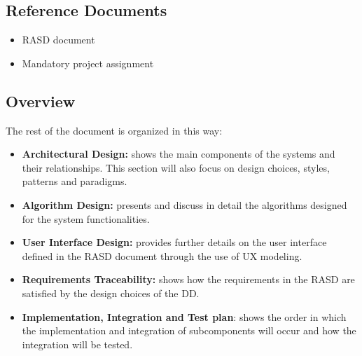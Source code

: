 \subsection{Reference Documents}
\begin{itemize}
	\item RASD document
	\item Mandatory project assignment
\end{itemize}

\subsection{Overview}
The rest of the document is organized in this way:
\begin{itemize}

	\item \textbf{Architectural Design:} shows the main components of the systems and their relationships. This section will also focus on design choices, styles, patterns and paradigms. 
	\item \textbf{Algorithm Design:} presents and discuss in detail the algorithms designed for the system functionalities.
	\item \textbf{User Interface Design:} provides further details on the user interface defined in the RASD document through the use of UX modeling. 
	\item \textbf{Requirements Traceability:} shows how the requirements in the RASD are satisfied by the design choices of the DD.
	\item \textbf{Implementation, Integration and Test plan}: shows the order in which the implementation and integration of subcomponents will occur and how the integration will be tested.

\end{itemize}


